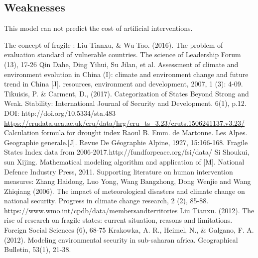 \documentclass{mcmthesis}
\begin{document}
\subsection{Weaknesses}
This model can not predict the cost of artificial interventions.



\begin{thebibliography}{99}
The concept of fragile : Liu Tianxu, \& Wu Tao. (2016). The problem of evaluation standard of vulnerable countries. The science of Leadership Forum (13), 17-26
Qin Dahe, Ding Yihui, Su Jilan, et al. Assessment of climate and environment evolution in China (I): climate and environment change and future trend in China [J]. resources, environment and development, 2007, 1 (3): 4-09.
Tikuisis, P. \& Carment, D., (2017). Categorization of States Beyond Strong and Weak. Stability: International Journal of Security and Development. 6(1), p.12. DOI: http://doi.org/10.5334/sta.483
\url{https://crudata.uea.ac.uk/cru/data/hrg/cru_ts_3.23/cruts.1506241137.v3.23/}
Calculation formula for drought index Raoul B. Emm. de Martonne. Les Alpes. Geographie generale.[J]. Revue De Géographie Alpine, 1927, 15:166-168.
Fragile States Index data from 2006-2017.http://fundforpeace.org/fsi/data/
Si Shoukui, sun Xijing. Mathematical modeling algorithm and application of [M]. National Defence Industry Press, 2011.
Supporting literature on human intervention measures: Zhang Haidong, Luo Yong, Wang Bangzhong, Dong Wenjie and Wang Zhiqiang (2006). The impact of meteorological disasters and climate change on national security. Progress in climate change research, 2 (2), 85-88.
\url{https://www.wmo.int/cpdb/data/membersandterritories}
Liu Tianxu. (2012). The rise of research on fragile states: current situation, reasons and limitations. Foreign Social Sciences (6), 68-75
Krakowka, A. R., Heimel, N., \& Galgano, F. A. (2012). Modeling environmental security in sub-saharan africa. Geographical Bulletin, 53(1), 21-38.
\end{thebibliography}

\newpage
\end{document}
